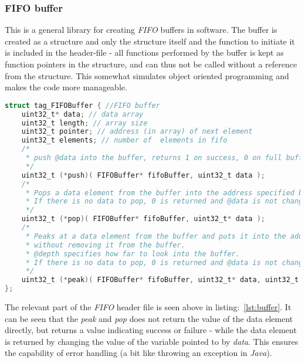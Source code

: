 \subsubsection{FIFO buffer}
This is a general library for creating \emph{FIFO} buffers in software.
The buffer is created as a structure and only the structure itself and the
function to initiate it is included in the header-file - all functions performed
by the buffer is kept as function pointers in the structure, and can thus not be
called without a reference from the structure. This somewhat simulates object
oriented programming and makes the code more manageable.

\begin{lstlisting}[caption={Relevant part of FIFO.h}, language=C,
label=lst:buffer] struct tag_FIFOBuffer { //FIFO buffer
	uint32_t* data; // data array
	uint32_t length; // array size
	uint32_t pointer; // address (in array) of next element
	uint32_t elements; // number of  elements in fifo
	/*
	 * push @data into the buffer, returns 1 on success, 0 on full buffer
	 */
	uint32_t (*push)( FIFOBuffer* fifoBuffer, uint32_t data );
	/*
	 * Pops a data element from the buffer into the address specified by the pointer @data.
	 * If there is no data to pop, 0 is returned and @data is not changed, else 1 is returned.
	 */
	uint32_t (*pop)( FIFOBuffer* fifoBuffer, uint32_t* data );
	/*
	 * Peaks at a data element from the buffer and puts it into the address specified by the pointer @data,
	 * without removing it from the buffer.
	 * @depth specifies how far to look into the buffer.
	 * If there is no data to pop, 0 is returned and @data is not changed, else 1 is returned.
	 */
	uint32_t (*peak)( FIFOBuffer* fifoBuffer, uint32_t* data, uint32_t depth ); // peak at the element depth into the stack (0 = top, 1 = just under top) - returns 1 if that element exists.
};
\end{lstlisting}

The  relevant part of the \emph{FIFO} header file is seen above in
listing:~\ref{lst:buffer}. It can be seen that the \emph{peak} and \emph{pop}
does not return the value of the data element directly, but returns a value
indicating success or failure - while the data element is returned by changing
the value of the variable pointed to by \emph{data}. This ensures the
capability of error handling (a bit like throwing an exception in \emph{Java}).



